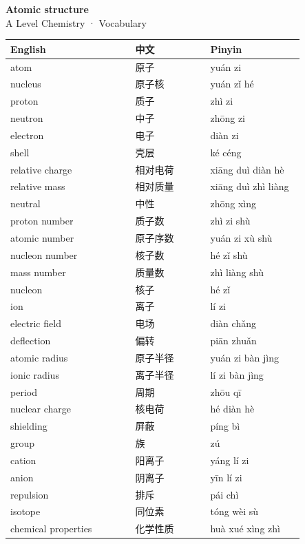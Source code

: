 \documentclass[11pt]{article}
\begin{document}
\begin{center}
  {\LARGE\bfseries Atomic structure}\\[0.35em]
  {\large A Level Chemistry · Vocabulary}
\end{center}
\vspace{0.6em}

\begin{longtable}{@{}p{0.40\linewidth}p{0.24\linewidth}p{0.30\linewidth}@{}}
\toprule
\textbf{English} & \textbf{中文} & \textbf{Pinyin} \\
\midrule
\endhead
\bottomrule
\endlastfoot
atom & 原子 & yuán zi \\
nucleus & 原子核 & yuán zǐ hé \\
proton & 质子 & zhì zi \\
neutron & 中子 & zhōng zi \\
electron & 电子 & diàn zi \\
shell & 壳层 & ké céng \\
relative charge & 相对电荷 & xiāng duì diàn hè \\
relative mass & 相对质量 & xiāng duì zhì liàng \\
neutral & 中性 & zhōng xìng \\
proton number & 质子数 & zhì zi shù \\
atomic number & 原子序数 & yuán zi xù shù \\
nucleon number & 核子数 & hé zǐ shù \\
mass number & 质量数 & zhì liàng shù \\
nucleon & 核子 & hé zǐ \\
ion & 离子 & lí zi \\
electric field & 电场 & diàn chǎng \\
deflection & 偏转 & piān zhuǎn \\
atomic radius & 原子半径 & yuán zi bàn jìng \\
ionic radius & 离子半径 & lí zi bàn jìng \\
period & 周期 & zhōu qī \\
nuclear charge & 核电荷 & hé diàn hè \\
shielding & 屏蔽 & píng bì \\
group & 族 & zú \\
cation & 阳离子 & yáng lí zi \\
anion & 阴离子 & yīn lí zi \\
repulsion & 排斥 & pái chì \\
isotope & 同位素 & tóng wèi sù \\
chemical properties & 化学性质 & huà xué xìng zhì \\

\end{longtable}
\end{document}
